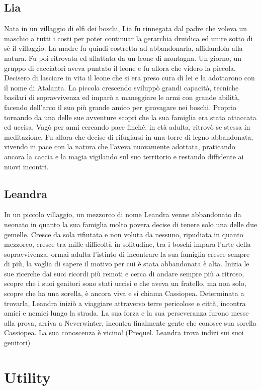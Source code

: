 \documentclass{article}
\begin{document}
\subsection{Lia}Nata in un villaggio di elfi dei boschi, Lia fu rinnegata dal padre che voleva un maschio a tutti i costi per poter continuar la gerarchia druidica ed unire sotto di sè il villaggio. La madre fu quindi costretta  ad abbandonarla, affidandola alla natura. Fu poi ritrovata ed allattata da un leone di montagna. Un giorno, un gruppo di cacciatori aveva puntato il leone e fu allora che videro la piccola. Decisero di lasciare in vita il leone che si era preso cura di lei e la adottarono con il nome di Atalanta. La piccola crescendo sviluppò grandi capacità, tecniche basilari di sopravvivenza ed imparò a maneggiare le armi con grande abilità, facendo dell'arco il suo più grande amico per girovagare nei boschi. Proprio tornando da una delle sue avventure scoprì che la sua famiglia era stata attaccata ed uccisa. Vagò per anni cercando pace finché, in età adulta, ritrovò se stessa in meditazione. Fu allora che  decise di rifugiarsi in una torre di legno abbandonata, vivendo in pace con la natura che l'aveva nuovamente  adottata, praticando ancora la caccia e la magia vigilando sul suo territorio e restando diffidente ai nuovi incontri.
\subsection{Leandra}In un piccolo villaggio, un mezzorco di nome Leandra venne abbandonato da neonato in quanto la sua famiglia molto povera decise di tenere solo una delle due gemelle. Cresce da sola rifiutata e non voluta da nessuno, ripudiata in quanto mezzorco, cresce tra mille difficoltà in solitudine, tra i boschi impara l'arte della sopravvivenza, ormai adulta l'istinto di incontrare la sua famiglia cresce sempre di più, la voglia di sapere il motivo per cui è stata abbandonata è alta. Inizia le sue ricerche dai suoi ricordi più remoti e cerca di andare sempre più a ritroso, scopre che i suoi genitori sono stati uccisi e che aveva un fratello, ma non solo, scopre che ha una sorella, è ancora viva e si chiama Cassiopea. Determinata a trovarla, Leandra iniziò a viaggiare attraverso terre pericolose e città, incontra amici e nemici lungo la strada. La sua forza e la sua perseveranza furono messe alla prova, arriva a Neverwinter, incontra  finalmente gente che conosce sua sorella Cassiopea. La sua conoscenza è vicino! (Prequel. Leandra trova indizi sui suoi genitori)
\section{Utility}
\end{document}
